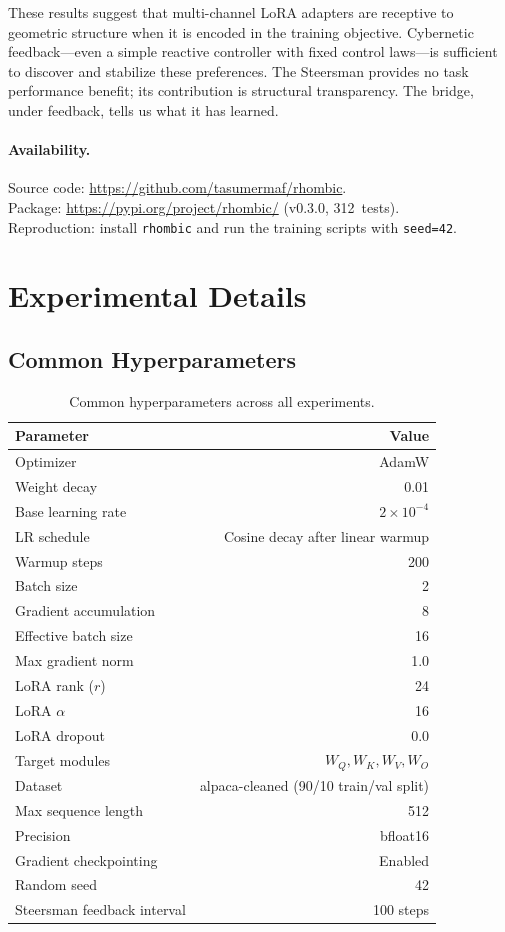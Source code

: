 \documentclass[11pt]{article}
\begin{document}
These results suggest that multi-channel LoRA adapters are receptive to
geometric structure when it is encoded in the training objective.
Cybernetic feedback---even a simple reactive controller with fixed
control laws---is sufficient to discover and stabilize these
preferences. The Steersman provides no task performance benefit; its
contribution is structural transparency. The bridge, under feedback,
tells us what it has learned.

\paragraph{Availability.}
Source code:
\url{https://github.com/tasumermaf/rhombic}.\\
Package: \url{https://pypi.org/project/rhombic/} (v0.3.0, 312~tests).\\
Reproduction: install \texttt{rhombic} and run the training scripts
with \texttt{seed=42}.


\appendix
\section{Experimental Details}
\label{app:details}

\subsection{Common Hyperparameters}

\begin{table}[H]
\centering
\caption{Common hyperparameters across all experiments.}
\label{tab:hyperparams}
\begin{tabular}{lr}
\toprule
Parameter & Value \\
\midrule
Optimizer & AdamW \\
Weight decay & 0.01 \\
Base learning rate & $2 \times 10^{-4}$ \\
LR schedule & Cosine decay after linear warmup \\
Warmup steps & 200 \\
Batch size & 2 \\
Gradient accumulation & 8 \\
Effective batch size & 16 \\
Max gradient norm & 1.0 \\
LoRA rank ($r$) & 24 \\
LoRA $\alpha$ & 16 \\
LoRA dropout & 0.0 \\
Target modules & $W_Q, W_K, W_V, W_O$ \\
Dataset & alpaca-cleaned (90/10 train/val split) \\
Max sequence length & 512 \\
Precision & bfloat16 \\
Gradient checkpointing & Enabled \\
Random seed & 42 \\
Steersman feedback interval & 100 steps \\
\bottomrule
\end{tabular}
\end{table}
\end{document}
